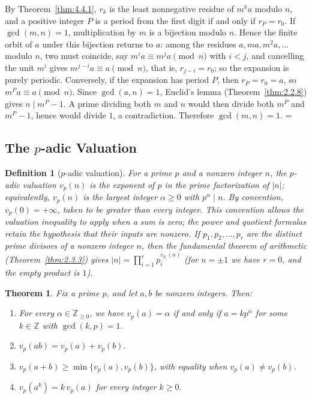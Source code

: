 \documentclass[11pt]{article}
\makeatletter
\let\nt@closedisplay\]
\def\nt@guardedclose{\@ifnextchar\par{\nt@closeafterpar}{\@ifnextchar\end{\postdisplaypenalty\@M\nt@closedisplay}{\nt@closedisplay}}}
\def\nt@closeafterpar\par{\@ifnextchar\par{\nt@closeafterpar}{\@ifnextchar\end{\postdisplaypenalty\@M\nt@closedisplay\par}{\nt@closedisplay\par}}}
\renewenvironment{proof}[1][\proofname]{\par
  \pushQED{\qed}\normalfont\topsep\medskipamount\edef\nt@afterproof{\@endparpenalty=\the\@endparpenalty\relax}\@beginparpenalty\@M\@endparpenalty\@M\let\]\nt@guardedclose\trivlist\item[]\textit{#1\@addpunct{.}} \ignorespaces}{\ifvmode\addpenalty\@M\fi\popQED\nt@afterproof\endtrivlist\@endpefalse}
\theoremstyle{ntstyle}
\newtheorem{theorem}{Theorem}[subsection]
\newtheorem{definition}{Definition}[subsection]
\makeatother
\begin{document}
\begin{proof} By Theorem~\ref{thm:4.4.1}, $r_k$ is the least
  nonnegative residue of $m^ka$ modulo $n$, and a positive integer $P$ is a
  period from the first digit if and only if $r_P=r_0$. If $\gcd(m,n)=1$,
  multiplication by $m$ is a bijection modulo $n$. Hence the finite orbit of
  $a$ under this bijection returns to $a$: among the residues
  $a, ma, m^{2}a, \ldots$ modulo $n$, two must coincide, say
  $m^{i}a \equiv m^{j}a \pmod{n}$ with $i<j$, and cancelling the unit
  $m^{i}$ gives $m^{j-i}a \equiv a \pmod{n}$, that is, $r_{j-i}=r_0$;
  so the expansion is purely
  periodic. Conversely, if the expansion has period $P$, then $r_P=r_0=a$,
  so $m^Pa\equiv a\pmod{n}$. Since $\gcd(a,n)=1$, Euclid's lemma (Theorem~\ref{thm:2.2.8}) gives
  $n\mid m^P-1$. A prime dividing both $m$ and $n$ would then divide both
  $m^P$ and $m^P-1$, hence would divide $1$, a contradiction. Therefore
  $\gcd(m,n)=1$.
\end{proof}
\subsection{The \texorpdfstring{$p$}{p}-adic Valuation}

\begin{definition}[$p$-adic valuation]\label{def:4.5.1}\label{def:p-adic-valuation}
  For a prime $p$ and a nonzero integer $n$, the $p$-adic valuation
  $v_p(n)$ is the exponent of $p$ in the prime factorization of $|n|$;
  equivalently, $v_p(n)$ is the largest integer $\alpha \ge 0$ with
  $p^{\alpha} \mid n$. By convention, $v_p(0)=+\infty$, taken to be greater than every integer.
  This convention allows the valuation inequality to apply when a sum is zero; the power and quotient
  formulas retain the hypothesis that their inputs are nonzero.
  If $p_1,p_2,\ldots,p_r$ are the distinct prime divisors of a nonzero
  integer $n$, then the fundamental theorem of arithmetic (Theorem~\ref{thm:2.3.3}) gives
  $|n|=\prod_{i=1}^{r}p_i^{v_{p_i}(n)}$ (for $n=\pm1$ we have $r=0$, and the empty product is $1$).

\end{definition}

\begin{theorem}\label{thm:4.5.1} Fix a prime $p$, and let $a,b$ be
  nonzero integers. Then:

  \begin{enumerate}[label={\alph*)}]
    \item For every $\alpha\in\mathbb{Z}_{\ge0}$, we have $v_p(a)=\alpha$ if and only if
          $a=kp^{\alpha}$ for some $k\in\mathbb{Z}$ with $\gcd(k,p)=1$.
    \item $v_p(ab) = v_p(a) + v_p(b)$.
    \item $v_p(a + b) \ge \min\{v_p(a), v_p(b)\}$, with equality when
          $v_p(a) \neq v_p(b)$.
    \item $v_p(a^{k}) = k\, v_p(a)$ for every integer $k \ge 0$.
  \end{enumerate}

\end{theorem}
\end{document}
